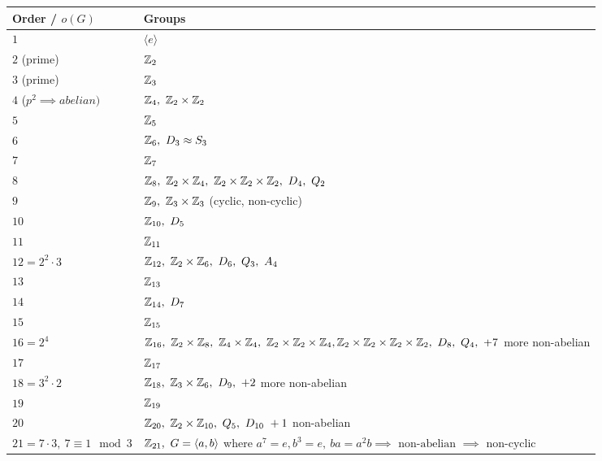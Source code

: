 \newpage 
\begin{table}[ht!]
    \centering
    \begin{tabular}{|l|p{}|} \hline
         \textbf{Order / }$o(G)$ & \textbf{Groups}  \\ \hline
         $1$ & $\langle e \rangle$ \\ \hline
         $2$ (prime) & ${\mathbb{ Z}}_2$ \\  \hline
         $3$ (prime) & ${\mathbb{ Z}}_3$ \\ \hline
         $4$ ($p^2\implies abelian)$ & $\Z_4 , \ \Z_2\times \Z_2$ \\ \hline
         $5$ & ${\mathbb{ Z}}_5$ \\ \hline
         $6$ & $\Z_6,\ D_3\approx S_3$ \\ \hline
         $7$ & ${\mathbb{ Z}}_7$ \\ \hline
         $8$ & $\Z_8, \ \Z_2\times \Z_4,  \ \Z_2\times \Z_2\times \Z_2, \ D_4, \ Q_2$ \\ \hline
         $9$ & $\Z_9, \ \Z_3\times \Z_3$ (cyclic, non-cyclic)\\ \hline
         $10$ & $\Z_{10}, \ D_5$ \\ \hline
         $11$ & ${\mathbb{ Z}}_{11}$ \\ \hline
         $12=2^2\cdot 3$ & $\Z_{12}, \ \Z_2\times \Z_6, \ D_6, \ Q_3, \ A_4$ \\ \hline
         $13$ & ${\mathbb{ Z}}_{13}$ \\ \hline
         $14$ & $\Z_{14}, \ D_7$ \\ \hline
         $15$ & ${\mathbb{ Z}}_{15}$ \\ \hline
         $16=2^4$ & $\Z_{16}, \ \Z_2\times \Z_8,\ \Z_4\times \Z_4, \ \Z_2\times \Z_2\times \Z_4, \ \newline \Z_2\times \Z_2\times \Z_2\times \Z_2, \ D_8, \ Q_4, \ + 7$ more non-abelian \\  \hline
         $17$ & ${\mathbb{ Z}}_{17}$ \\  \hline
         $18=3^2\cdot 2$ & $\Z_{18}, \ \Z_3\times \Z_6, \ D_9,  \ + 2$ more non-abelian \\ \hline
         $19$ & ${\mathbb{ Z}}_{19}$ \\ \hline
         $20$ & $\Z_{20}, \ \Z_2\times \Z_{10}, \ Q_5, \ D_{10} \ + 1$ non-abelian \\ \hline
         $21=7\cdot 3, \ 7\equiv 1\mod 3$ & $\Z_{21},  \ G=\langle a,b\rangle$ \newline where $a^7=e, b^3=e, \ ba=a^2b \implies \text{ non-abelian }\implies \text{ non-cyclic}$ \\ \hline

\end{tabular}
\end{table}
